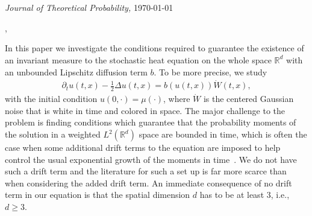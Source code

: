 \documentclass[12pt]{article}
\numberwithin{equation}{section}
\newcommand{\R}{\mathbb{R}}
\begin{document}
\thispagestyle{firstpage}
$ $
\vspace{.7in}

 \\
{\it Journal of Theoretical Probability,} \hfill \today

\vspace{1em}

,

\vspace{1em}

In this paper we investigate the conditions required to guarantee the existence of an invariant
measure to the stochastic heat equation on the whole space $\R^d$ with an unbounded Lipschitz
diffusion term $b$. To be more precise, we study
\begin{align*}
  \partial_tu(t,x) - \frac{1}{2} \Delta u(t,x) = b(u(t,x))\dot{W}(t,x),
\end{align*}
with the initial condition $u(0, \cdot) = \mu(\cdot)$, where $\dot{W}$ is the centered Gaussian
noise that is white in time and colored in space. The major challenge to the problem is finding
conditions which guarantee that the probability moments of the solution in a weighted $L^2(\R^d)$
space are bounded in time, which is often the case when some additional drift terms to the equation
are imposed to help control the usual exponential growth of the moments in
time~\cite{misiats.stanzhytskyi.ea:16:existence, misiats.stanzhytskyi.ea:20:invariant,
assing.manthey:03:invariant}. We do not have such a drift term and the literature for such a set up
is far more scarce than when considering the added drift term. An immediate consequence of no drift
term in our equation is that the spatial dimension $d$ has to be at least $3$, i.e., $d\ge 3$.

\vspace{.5em}
\end{document}

